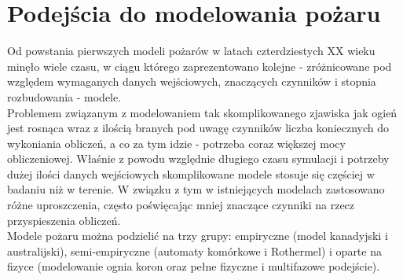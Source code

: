 \documentclass[a4paper, 11pt]{article}
\begin{document}
	\section*{Podejścia do modelowania pożaru}
	\indent
	
	Od powstania pierwszych modeli pożarów w latach czterdziestych XX wieku minęło wiele czasu, w ciągu którego zaprezentowano kolejne - zróżnicowane pod względem wymaganych danych wejściowych, znaczących czynników i stopnia rozbudowania - modele.\\
	\indent	Problemem związanym z modelowaniem tak skomplikowanego zjawiska jak ogień jest rosnąca wraz z ilością branych pod uwagę czynników liczba koniecznych do wykoniania obliczeń, a co za tym idzie - potrzeba coraz większej mocy obliczeniowej. Właśnie  z powodu względnie długiego czasu symulacji i potrzeby dużej ilości danych wejściowych skomplikowane modele stosuje się częściej w badaniu niż w terenie.  W związku z tym w istniejących modelach zastosowano różne uproszczenia, często poświęcając mniej znaczące czynniki na rzecz przyspieszenia obliczeń.  \\
\indent	Modele pożaru można podzielić na trzy grupy: empiryczne (model kanadyjski i australijski), semi-empiryczne (automaty komórkowe i Rothermel) i oparte na fizyce (modelowanie ognia koron oraz pełne fizyczne i multifazowe podejście).
	
	\iffalse
	 \subsubsection*{Modele empiryczne}
	\begin{itemize}
	\item Kanadyjski
	\item Australijski
	\end{itemize}
	\subsubsection*{Modele semi-empiryczne}
	\begin{itemize}
	\item Automaty komórkowe
	\item Rothermel
	\end{itemize}
	\subsubsection*{Modele oparte na fizyce}
	\begin{itemize}
	\item Modelowanie ognia koron 
	\item Pełne fizyczne i multifazowe podejście
	\end{itemize}
	\fi
	
\end{document}
